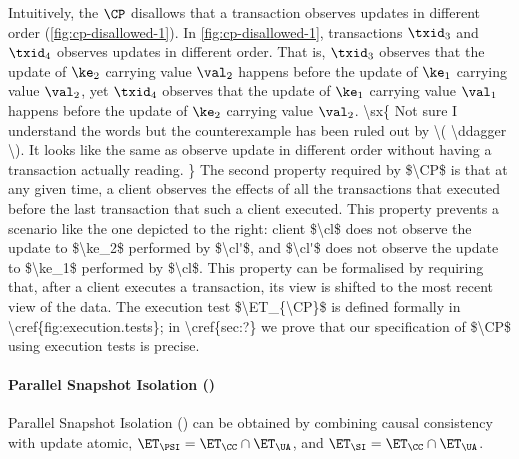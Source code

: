 Intuitively, the \( \CP \) disallows that a transaction observes updates in different order (\cref{fig:cp-disallowed-1}).
In \cref{fig:cp-disallowed-1}, transactions $\txid_{3}$ and \( \txid_4 \) observes updates in different order.
That is, \( \txid_3 \) observes that the update of $\ke_2$ carrying value $\val_2$ happens before the update of $\ke_1$ carrying value $\val_2$,
yet $\txid_{4}$ observes that the update of $\ke_1$ carrying value $\val_1$ happens before the update of $\ke_2$ carrying value $\val_2$. 
\ac{
    \sx{ Not sure I understand the words but the counterexample has  been ruled out by \( \ddagger \). 
         It looks like the same as observe update in different order without having a transaction actually reading. }
The second property required by $\CP$ is that at any given time, 
a client observes the effects of all the transactions that  
executed before the last transaction that such a client executed. 
This property prevents a scenario like the one depicted to the 
right: client $\cl$ does not observe the update to $\ke_2$ performed 
by $\cl'$, and $\cl'$ does not observe the update to $\ke_1$ performed 
by $\cl$. This property can be formalised by requiring that, after 
a client executes a transaction, its view is shifted to the most recent 
view of the data. The execution test $\ET_{\CP}$ is defined formally 
in \cref{fig:execution.tests}; in \cref{sec:?} we prove that our specification  
of $\CP$ using execution tests is precise. 
}

\paragraph{Parallel Snapshot Isolation (\PSI)} 
Parallel Snapshot Isolation (\PSI) can be obtained by combining causal consistency with update atomic, 
$\ET_{\PSI} = \ET_{\CC} \cap \ET_{\UA}$, and $\ET_{\SI} = \ET_{\CC} \cap \ET_{\UA}$.

